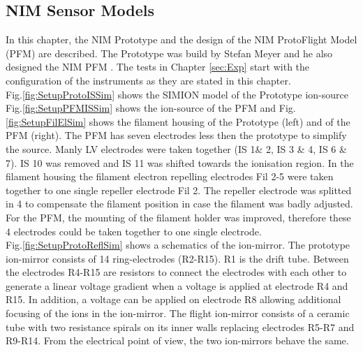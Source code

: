 	\subsection{NIM Sensor Models}\label{subsec:setupInst}
	In this chapter, the NIM Prototype and the design of the NIM ProtoFlight Model (PFM) are described. The Prototype was build by Stefan Meyer and he also designed the NIM PFM \cite{Diss_Meyer}. The tests in Chapter \ref{sec:Exp} start with the configuration of the instruments as they are stated in this chapter.\\
	Fig.\ref{fig:SetupProtoISSim} shows the SIMION model of the Prototype ion-source Fig.\ref{fig:SetupPFMISSim} shows the ion-source of the PFM and Fig.\ref{fig:SetupFilElSim} shows the filament housing of the Prototype (left) and of the PFM (right). The PFM has seven electrodes less then the prototype to simplify the source. Manly LV electrodes were taken together (IS 1\& 2, IS 3 \& 4, IS 6 \& 7). IS 10 was removed and IS 11 was shifted towards the ionisation region. In the filament housing the filament electron repelling electrodes Fil 2-5 were taken together to one single repeller electrode Fil 2. The repeller electrode was splitted in 4 to compensate the filament position in case the filament was badly adjusted. For the PFM, the mounting of the filament holder was improved, therefore these 4 electrodes could be taken together to one single electrode.\\
	Fig.\ref{fig:SetupProtoReflSim} shows a schematics of the ion-mirror. The prototype ion-mirror consists of 14 ring-electrodes (R2-R15). R1 is the drift tube. Between the electrodes R4-R15 are resistors to connect the electrodes with each other to generate a linear voltage gradient when a voltage is applied at electrode R4 and R15. In addition, a voltage can be applied on electrode R8 allowing additional focusing of the ions in the ion-mirror.	The flight ion-mirror consists of a ceramic tube with two resistance spirals on its inner walls replacing electrodes R5-R7 and R9-R14. From the electrical point of view, the two ion-mirrors behave the same.
	
	
	
